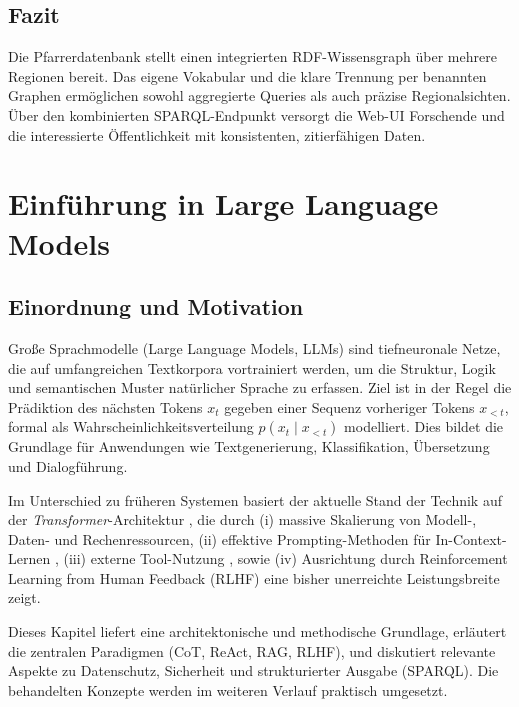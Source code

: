 \subsection{Fazit}
Die Pfarrerdatenbank stellt einen integrierten RDF-Wissensgraph über mehrere Regionen bereit. Das eigene Vokabular und die klare Trennung per benannten Graphen ermöglichen sowohl aggregierte Queries als auch präzise Regionalsichten. Über den kombinierten SPARQL-Endpunkt versorgt die Web-UI Forschende und die interessierte Öffentlichkeit mit konsistenten, zitierfähigen Daten.








\section{Einführung in Large Language Models}
\label{sec:llm}

\subsection{Einordnung und Motivation}

Große Sprachmodelle (Large Language Models, LLMs) sind tiefneuronale Netze, die auf umfangreichen Textkorpora vortrainiert werden, um die Struktur, Logik und semantischen Muster natürlicher Sprache zu erfassen. Ziel ist in der Regel die Prädiktion des nächsten Tokens $x_t$ gegeben einer Sequenz vorheriger Tokens $x_{<t}$, formal als Wahrscheinlichkeitsverteilung $p(x_t \mid x_{<t})$ modelliert. Dies bildet die Grundlage für Anwendungen wie Textgenerierung, Klassifikation, Übersetzung und Dialogführung.

Im Unterschied zu früheren Systemen basiert der aktuelle Stand der Technik auf der \emph{Transformer}-Architektur \cite{vaswani2017attention}, die durch (i) massive Skalierung von Modell-, Daten- und Rechenressourcen, (ii) effektive Prompting-Methoden für In-Context-Lernen \cite{brown2020language,wei2022chain}, (iii) externe Tool-Nutzung \cite{yao2023react}, sowie (iv) Ausrichtung durch Reinforcement Learning from Human Feedback (RLHF) \cite{ouyang2022training} eine bisher unerreichte Leistungsbreite zeigt.

Dieses Kapitel liefert eine architektonische und methodische Grundlage, erläutert die zentralen Paradigmen (CoT, ReAct, RAG, RLHF), und diskutiert relevante Aspekte zu Datenschutz, Sicherheit und strukturierter Ausgabe (SPARQL). Die behandelten Konzepte werden im weiteren Verlauf praktisch umgesetzt.

